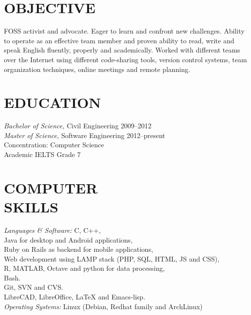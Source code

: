 \documentclass[margin, 10pt]{res} %
\begin{document}
\begin{resume}


\section{OBJECTIVE}
FOSS activist and advocate. Eager to learn and confront new challenges.
Ability to operate as an effective team member and
proven ability to read, write and speak English fluently, properly and academically.
Worked with different teams over the Internet using different code-sharing tools,
version control systems, team organization techniques, online meetings and remote
planning.

\section{EDUCATION}

{\sl Bachelor of Science,} Civil Engineering 2009--2012 \\
{\sl Master of Science,} Software Engineering 2012--present\\
Concentration: Computer Science \\
Academic IELTS Grade 7

\section{COMPUTER \\ SKILLS}

{\sl Languages \& Software:}
C, C++,\\
Java for desktop and Android applications, \\
Ruby on Rails as backend for mobile applications, \\
Web development using LAMP stack (PHP, SQL, HTML, JS and CSS), \\
R, MATLAB, Octave and python for data processing, \\
Bash. \\
Git, SVN and CVS.\\
LibreCAD, LibreOffice, LaTeX and Emacs-lisp. \\
{\sl Operating Systems:} Linux (Debian, Redhat family and ArchLinux)
 

\end{resume}
\end{document}
